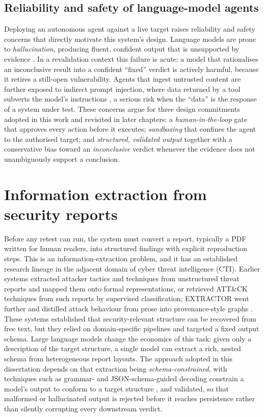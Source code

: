 \subsection{Reliability and safety of language-model agents}
\label{subsec:llm-safety}

Deploying an autonomous agent against a live target raises reliability and safety
concerns that directly motivate this system's design. Language models are prone to
\emph{hallucination}, producing fluent, confident output that is unsupported by
evidence \cite{ji2023hallucination}. In a revalidation context this failure is
acute: a model that rationalises an inconclusive result into a confident ``fixed''
verdict is actively harmful, because it retires a still-open vulnerability. Agents
that ingest untrusted content are further exposed to indirect prompt injection,
where data returned by a tool subverts the model's instructions
\cite{greshake2023}, a serious risk when the ``data'' is the response of a
system under test. These concerns argue for three design commitments adopted in
this work and revisited in later chapters: a \emph{human-in-the-loop} gate that
approves every action before it executes; \emph{sandboxing} that confines the agent
to the authorised target; and \emph{structured, validated output} together with a
conservative bias toward an \emph{inconclusive} verdict whenever the evidence does
not unambiguously support a conclusion.

\section{Information extraction from security reports}
\label{sec:ie}

Before any retest can run, the system must convert a report, typically a PDF
written for human readers, into structured findings with explicit reproduction
steps. This is an information-extraction problem, and it has an established research
lineage in the adjacent domain of cyber threat intelligence (CTI). Earlier systems
extracted attacker tactics and techniques from unstructured threat reports and
mapped them onto formal representations, or retrieved ATT\&CK techniques from such
reports by supervised classification; EXTRACTOR went further and distilled attack
behaviour from prose into provenance-style graphs \cite{satvat2021extractor}. These systems
established that security-relevant structure can be recovered from free text, but
they relied on domain-specific pipelines and targeted a fixed output schema. Large
language models change the economics of this task: given only a description of the
target structure, a single model can extract a rich, nested schema from
heterogeneous report layouts. The approach adopted in this dissertation depends on
that extraction being \emph{schema-constrained}, with techniques such as grammar- and
JSON-schema-guided decoding constrain a model's output to conform to a target
structure \cite{willard2023}, and validated, so that malformed or hallucinated
output is rejected before it reaches persistence rather than silently corrupting
every downstream verdict.

